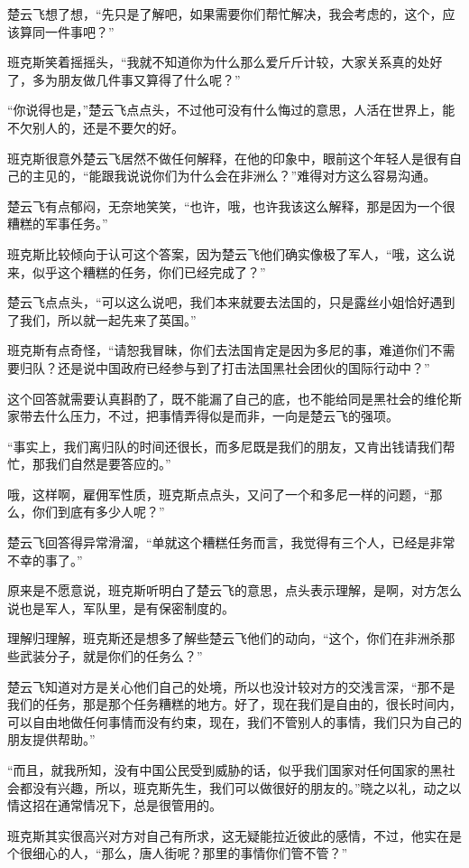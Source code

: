 楚云飞想了想，“先只是了解吧，如果需要你们帮忙解决，我会考虑的，这个，应该算同一件事吧？”

班克斯笑着摇摇头，“我就不知道你为什么那么爱斤斤计较，大家关系真的处好了，多为朋友做几件事又算得了什么呢？”

“你说得也是，”楚云飞点点头，不过他可没有什么悔过的意思，人活在世界上，能不欠别人的，还是不要欠的好。

班克斯很意外楚云飞居然不做任何解释，在他的印象中，眼前这个年轻人是很有自己的主见的，“能跟我说说你们为什么会在非洲么？”难得对方这么容易沟通。

楚云飞有点郁闷，无奈地笑笑，“也许，哦，也许我该这么解释，那是因为一个很糟糕的军事任务。”

班克斯比较倾向于认可这个答案，因为楚云飞他们确实像极了军人，“哦，这么说来，似乎这个糟糕的任务，你们已经完成了？”

楚云飞点点头，“可以这么说吧，我们本来就要去法国的，只是露丝小姐恰好遇到了我们，所以就一起先来了英国。”

班克斯有点奇怪，“请恕我冒昧，你们去法国肯定是因为多尼的事，难道你们不需要归队？还是说中国政府已经参与到了打击法国黑社会团伙的国际行动中？”

这个回答就需要认真斟酌了，既不能漏了自己的底，也不能给同是黑社会的维伦斯家带去什么压力，不过，把事情弄得似是而非，一向是楚云飞的强项。

“事实上，我们离归队的时间还很长，而多尼既是我们的朋友，又肯出钱请我们帮忙，那我们自然是要答应的。”

哦，这样啊，雇佣军性质，班克斯点点头，又问了一个和多尼一样的问题，“那么，你们到底有多少人呢？”

楚云飞回答得异常滑溜，“单就这个糟糕任务而言，我觉得有三个人，已经是非常不幸的事了。”

原来是不愿意说，班克斯听明白了楚云飞的意思，点头表示理解，是啊，对方怎么说也是军人，军队里，是有保密制度的。

理解归理解，班克斯还是想多了解些楚云飞他们的动向，“这个，你们在非洲杀那些武装分子，就是你们的任务么？”

楚云飞知道对方是关心他们自己的处境，所以也没计较对方的交浅言深，“那不是我们的任务，那是那个任务糟糕的地方。好了，现在我们是自由的，很长时间内，可以自由地做任何事情而没有约束，现在，我们不管别人的事情，我们只为自己的朋友提供帮助。”

“而且，就我所知，没有中国公民受到威胁的话，似乎我们国家对任何国家的黑社会都没有兴趣，所以，班克斯先生，我们可以做很好的朋友的。”晓之以礼，动之以情这招在通常情况下，总是很管用的。

班克斯其实很高兴对方对自己有所求，这无疑能拉近彼此的感情，不过，他实在是个很细心的人，“那么，唐人街呢？那里的事情你们管不管？”

